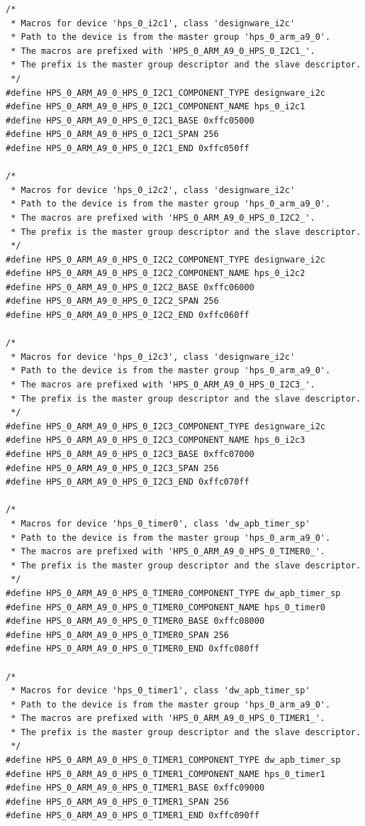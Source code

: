\documentclass[conference]{IEEEtran}
\begin{document}
\begin{lstlisting}
/*
 * Macros for device 'hps_0_i2c1', class 'designware_i2c'
 * Path to the device is from the master group 'hps_0_arm_a9_0'.
 * The macros are prefixed with 'HPS_0_ARM_A9_0_HPS_0_I2C1_'.
 * The prefix is the master group descriptor and the slave descriptor.
 */
#define HPS_0_ARM_A9_0_HPS_0_I2C1_COMPONENT_TYPE designware_i2c
#define HPS_0_ARM_A9_0_HPS_0_I2C1_COMPONENT_NAME hps_0_i2c1
#define HPS_0_ARM_A9_0_HPS_0_I2C1_BASE 0xffc05000
#define HPS_0_ARM_A9_0_HPS_0_I2C1_SPAN 256
#define HPS_0_ARM_A9_0_HPS_0_I2C1_END 0xffc050ff

/*
 * Macros for device 'hps_0_i2c2', class 'designware_i2c'
 * Path to the device is from the master group 'hps_0_arm_a9_0'.
 * The macros are prefixed with 'HPS_0_ARM_A9_0_HPS_0_I2C2_'.
 * The prefix is the master group descriptor and the slave descriptor.
 */
#define HPS_0_ARM_A9_0_HPS_0_I2C2_COMPONENT_TYPE designware_i2c
#define HPS_0_ARM_A9_0_HPS_0_I2C2_COMPONENT_NAME hps_0_i2c2
#define HPS_0_ARM_A9_0_HPS_0_I2C2_BASE 0xffc06000
#define HPS_0_ARM_A9_0_HPS_0_I2C2_SPAN 256
#define HPS_0_ARM_A9_0_HPS_0_I2C2_END 0xffc060ff

/*
 * Macros for device 'hps_0_i2c3', class 'designware_i2c'
 * Path to the device is from the master group 'hps_0_arm_a9_0'.
 * The macros are prefixed with 'HPS_0_ARM_A9_0_HPS_0_I2C3_'.
 * The prefix is the master group descriptor and the slave descriptor.
 */
#define HPS_0_ARM_A9_0_HPS_0_I2C3_COMPONENT_TYPE designware_i2c
#define HPS_0_ARM_A9_0_HPS_0_I2C3_COMPONENT_NAME hps_0_i2c3
#define HPS_0_ARM_A9_0_HPS_0_I2C3_BASE 0xffc07000
#define HPS_0_ARM_A9_0_HPS_0_I2C3_SPAN 256
#define HPS_0_ARM_A9_0_HPS_0_I2C3_END 0xffc070ff

/*
 * Macros for device 'hps_0_timer0', class 'dw_apb_timer_sp'
 * Path to the device is from the master group 'hps_0_arm_a9_0'.
 * The macros are prefixed with 'HPS_0_ARM_A9_0_HPS_0_TIMER0_'.
 * The prefix is the master group descriptor and the slave descriptor.
 */
#define HPS_0_ARM_A9_0_HPS_0_TIMER0_COMPONENT_TYPE dw_apb_timer_sp
#define HPS_0_ARM_A9_0_HPS_0_TIMER0_COMPONENT_NAME hps_0_timer0
#define HPS_0_ARM_A9_0_HPS_0_TIMER0_BASE 0xffc08000
#define HPS_0_ARM_A9_0_HPS_0_TIMER0_SPAN 256
#define HPS_0_ARM_A9_0_HPS_0_TIMER0_END 0xffc080ff

/*
 * Macros for device 'hps_0_timer1', class 'dw_apb_timer_sp'
 * Path to the device is from the master group 'hps_0_arm_a9_0'.
 * The macros are prefixed with 'HPS_0_ARM_A9_0_HPS_0_TIMER1_'.
 * The prefix is the master group descriptor and the slave descriptor.
 */
#define HPS_0_ARM_A9_0_HPS_0_TIMER1_COMPONENT_TYPE dw_apb_timer_sp
#define HPS_0_ARM_A9_0_HPS_0_TIMER1_COMPONENT_NAME hps_0_timer1
#define HPS_0_ARM_A9_0_HPS_0_TIMER1_BASE 0xffc09000
#define HPS_0_ARM_A9_0_HPS_0_TIMER1_SPAN 256
#define HPS_0_ARM_A9_0_HPS_0_TIMER1_END 0xffc090ff


\end{lstlisting}
\end{document}
